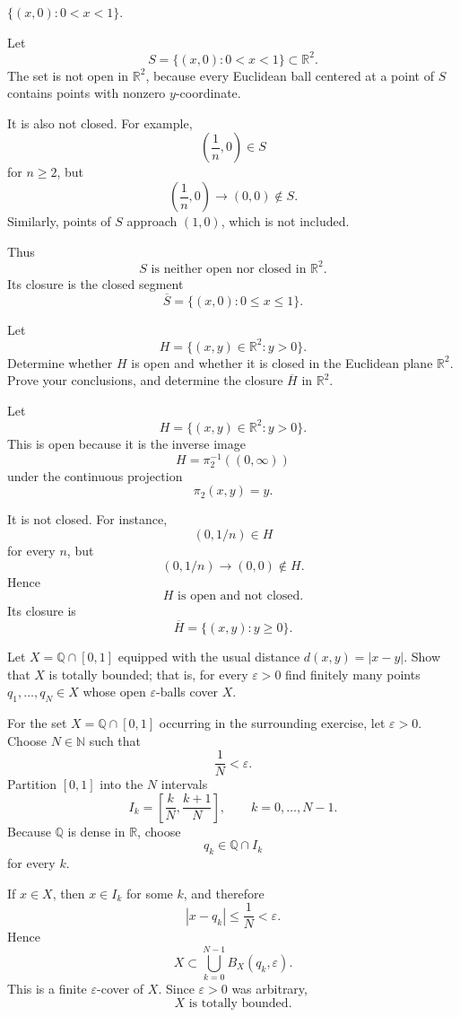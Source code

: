 \begin{problem}[CP-IV-0085]
\label{prob:cp-iv-0085}
\par\noindent\textbullet\quad $\{(x,0): 0< x< 1\}$.
\end{problem}

\begin{solution}
Let
\[
S=\{(x,0):0<x<1\}\subset\mathbb R^2.
\]
The set is not open in \(\mathbb R^2\), because every Euclidean ball centered at a point of \(S\) contains points with nonzero \(y\)-coordinate.

It is also not closed. For example,
\[
\left(\frac1n,0\right)\in S
\]
for \(n\ge2\), but
\[
\left(\frac1n,0\right)\longrightarrow(0,0)\notin S.
\]
Similarly, points of \(S\) approach \((1,0)\), which is not included.

Thus
\[
\boxed{
S\text{ is neither open nor closed in }\mathbb R^2.
}
\]
Its closure is the closed segment
\[
\overline S=\{(x,0):0\le x\le1\}.
\]
\end{solution}


\begin{problem}[CP-IV-0087]
\label{prob:cp-iv-0087}
Let
\[
H=\{(x,y)\in\mathbb R^2:y>0\}.
\]
Determine whether $H$ is open and whether it is closed in the Euclidean
plane $\mathbb R^2$. Prove your conclusions, and determine the closure
$\overline H$ in $\mathbb R^2$.
\end{problem}

\begin{solution}
Let
\[
H=\{(x,y)\in\mathbb R^2:y>0\}.
\]
This is open because it is the inverse image
\[
H=\pi_2^{-1}((0,\infty))
\]
under the continuous projection
\[
\pi_2(x,y)=y.
\]

It is not closed. For instance,
\[
(0,1/n)\in H
\]
for every \(n\), but
\[
(0,1/n)\longrightarrow(0,0)\notin H.
\]
Hence
\[
\boxed{
H\text{ is open and not closed}.
}
\]
Its closure is
\[
\overline H=\{(x,y):y\ge0\}.
\]
\end{solution}


\begin{problem}[CP-IV-0088]
\label{prob:cp-iv-0088}
Let $X=\mathbb{Q}\cap[0,1]$ equipped with the usual distance $d(x,y)=|x-y|$. Show that $X$ is totally bounded; that is, for every $\varepsilon>0$ find finitely many points $q_1,\dots,q_N\in X$ whose open $\varepsilon$-balls cover $X$.
\end{problem}

\begin{solution}
For the set \(X=\mathbb Q\cap[0,1]\) occurring in the surrounding exercise, let
\(\varepsilon>0\). Choose \(N\in\mathbb N\) such that
\[
\frac1N<\varepsilon.
\]
Partition \([0,1]\) into the \(N\) intervals
\[
I_k=\left[\frac{k}{N},\frac{k+1}{N}\right],
\qquad k=0,\ldots,N-1.
\]
Because \(\mathbb Q\) is dense in \(\mathbb R\), choose
\[
q_k\in \mathbb Q\cap I_k
\]
for every \(k\).

If \(x\in X\), then \(x\in I_k\) for some \(k\), and therefore
\[
|x-q_k|\le \frac1N<\varepsilon.
\]
Hence
\[
X\subset
\bigcup_{k=0}^{N-1}B_X(q_k,\varepsilon).
\]
This is a finite \(\varepsilon\)-cover of \(X\). Since \(\varepsilon>0\) was arbitrary,
\[
\boxed{X\text{ is totally bounded}.}
\]
\end{solution}


